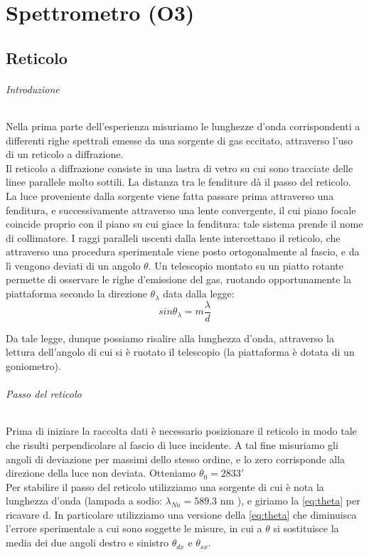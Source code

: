 \chapter{Spettrometro (O3)}


\section*{Reticolo}

\subparagraph{Introduzione}

Nella prima parte dell'esperienza misuriamo le lunghezze d'onda corrispondenti a differenti righe spettrali emesse da una sorgente di gas eccitato, attraverso l'uso di un reticolo a diffrazione. \\
Il reticolo a diffrazione consiste in una lastra di vetro su cui sono tracciate delle linee parallele molto sottili. La distanza tra le fenditure dà il passo del reticolo.\\
La luce proveniente dalla sorgente viene fatta passare prima attraverso una fenditura, e successivamente attraverso una lente convergente, il cui piano focale coincide proprio con il piano su cui giace la fenditura: tale sistema prende il nome di collimatore. I raggi paralleli uscenti dalla lente intercettano il reticolo, che attraverso una procedura sperimentale viene posto ortogonalmente al fascio, e da lì vengono deviati di un angolo $\theta$. Un telescopio montato su un piatto rotante permette di osservare le righe d'emissione del gas, ruotando opportunamente la piattaforma secondo la direzione $\theta_{\lambda} $ data dalla legge:
\begin{equation}
sin \theta_{\lambda} = m \frac{\lambda}{d}
\label{eq:theta}
\end{equation}


Da tale legge, dunque possiamo risalire alla lunghezza d'onda, attraverso la lettura dell'angolo di cui si è ruotato il telescopio (la piattaforma è dotata di un goniometro).

\subparagraph{Passo del reticolo}

Prima di iniziare la raccolta dati è necessario posizionare il reticolo in modo tale che risulti perpendicolare al fascio di luce incidente. A tal fine misuriamo gli angoli di deviazione per massimi dello stesso ordine, e lo zero corrisponde alla direzione della luce non deviata. Otteniamo $\theta_{0} = 283 3' $ \\
Per stabilire il passo del reticolo utilizziamo una sorgente di cui è nota la lunghezza d'onda (lampada a sodio: $\lambda_{Na} = 589.3 $ nm ), e giriamo la \ref{eq:theta} per ricavare d. In particolare utilizziamo una versione della \ref{eq:theta} che diminuisca l'errore sperimentale a cui sono soggette le misure, in cui a $\theta$ si sostituisce la media dei due angoli destro e sinistro $\theta_{dx} $ e $\theta_{sx}$.

